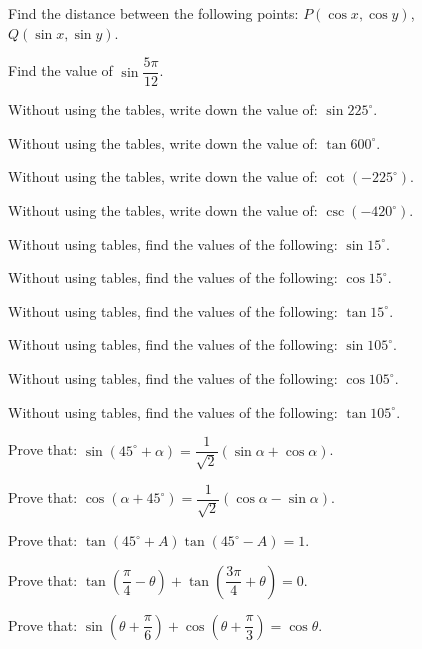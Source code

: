 \documentclass[11pt,a4paper]{article}
\begin{document}
\begin{shortlist}
\item Find the distance between the following points: $P(\cos x,\cos y)$, $Q(\sin x,\sin y)$.

\item Find the value of $\sin\dfrac{5\pi}{12}$.

\item Without using the tables, write down the value of: $\sin 225^\circ$.

\item Without using the tables, write down the value of: $\tan 600^\circ$.

\item Without using the tables, write down the value of: $\cot(-225^\circ)$.

\item Without using the tables, write down the value of: $\csc(-420^\circ)$.

\item Without using tables, find the values of the following: $\sin 15^\circ$.

\item Without using tables, find the values of the following: $\cos 15^\circ$.

\item Without using tables, find the values of the following: $\tan 15^\circ$.

\item Without using tables, find the values of the following: $\sin 105^\circ$.

\item Without using tables, find the values of the following: $\cos 105^\circ$.

\item Without using tables, find the values of the following: $\tan 105^\circ$.

\item Prove that: $\sin(45^\circ+\alpha)=\dfrac{1}{\sqrt{2}}(\sin\alpha+\cos\alpha)$.

\item Prove that: $\cos(\alpha+45^\circ)=\dfrac{1}{\sqrt{2}}(\cos\alpha-\sin\alpha)$.

\item Prove that: $\tan(45^\circ+A)\tan(45^\circ-A)=1$.

\item Prove that: $\tan\left(\dfrac{\pi}{4}-\theta\right)+\tan\left(\dfrac{3\pi}{4}+\theta\right)=0$.

\item Prove that: $\sin\left(\theta+\dfrac{\pi}{6}\right)+\cos\left(\theta+\dfrac{\pi}{3}\right)=\cos\theta$.


\end{shortlist}
\end{document}
